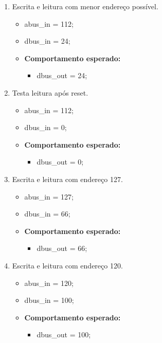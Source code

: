 \documentclass{article}
\begin{document}
\begin{enumerate}
    \item  Escrita e leitura com menor endereço possível.
    \begin{itemize}
        \item abus\_in = 112;
        \item dbus\_in = 24;
        \item \textbf{Comportamento esperado:}
        \begin{itemize}
            \item dbus\_out = 24;
        \end{itemize}
    \end{itemize}
    
    \item Testa leitura após reset.
    \begin{itemize}
        \item abus\_in = 112;
        \item dbus\_in = 0;
        \item \textbf{Comportamento esperado:}
        \begin{itemize}
            \item dbus\_out = 0;
        \end{itemize}
    \end{itemize}

    \item  Escrita e leitura com endereço 127.
    \begin{itemize}
        \item abus\_in = 127;
        \item dbus\_in = 66;
        \item \textbf{Comportamento esperado:}
        \begin{itemize}
            \item dbus\_out = 66;
        \end{itemize}
    \end{itemize}

    \item  Escrita e leitura com endereço 120.
    \begin{itemize}
        \item abus\_in = 120;
        \item dbus\_in = 100;
        \item \textbf{Comportamento esperado:}
        \begin{itemize}
            \item dbus\_out = 100;
        \end{itemize}
    \end{itemize}


\end{enumerate}
\end{document}
